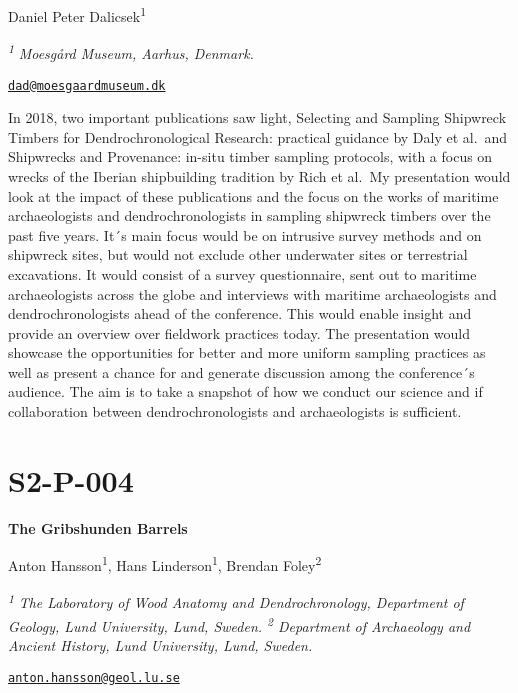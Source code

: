 \documentclass[
]{book}
\begin{document}
Daniel Peter Dalicsek\textsuperscript{1}

\textsuperscript{\emph{1}} \emph{Moesgård Museum, Aarhus, Denmark.}

\href{mailto:dad@moesgaardmuseum.dk}{\nolinkurl{dad@moesgaardmuseum.dk}}

In 2018, two important publications saw light, Selecting and Sampling Shipwreck Timbers for Dendrochronological Research: practical guidance by Daly et al.~and Shipwrecks and Provenance: in-situ timber sampling protocols, with a focus on wrecks of the Iberian shipbuilding tradition by Rich et al.~My presentation would look at the impact of these publications and the focus on the works of maritime archaeologists and dendrochronologists in sampling shipwreck timbers over the past five years. It´s main focus would be on intrusive survey methods and on shipwreck sites, but would not exclude other underwater sites or terrestrial excavations. It would consist of a survey questionnaire, sent out to maritime archaeologists across the globe and interviews with maritime archaeologists and dendrochronologists ahead of the conference. This would enable insight and provide an overview over fieldwork practices today. The presentation would showcase the opportunities for better and more uniform sampling practices as well as present a chance for and generate discussion among the conference´s audience. The aim is to take a snapshot of how we conduct our science and if collaboration between dendrochronologists and archaeologists is sufficient.

\hypertarget{s2-p-004}{%
\section*{S2-P-004}\label{s2-p-004}}

\textbf{The Gribshunden Barrels}

Anton Hansson\textsuperscript{1}, Hans Linderson\textsuperscript{1}, Brendan Foley\textsuperscript{2}

\textsuperscript{\emph{1}} \emph{The Laboratory of Wood Anatomy and Dendrochronology, Department of Geology, Lund University, Lund, Sweden. \textsuperscript{2} Department of Archaeology and Ancient History, Lund University, Lund, Sweden.}

\href{mailto:anton.hansson@geol.lu.se}{\nolinkurl{anton.hansson@geol.lu.se}}
\end{document}

